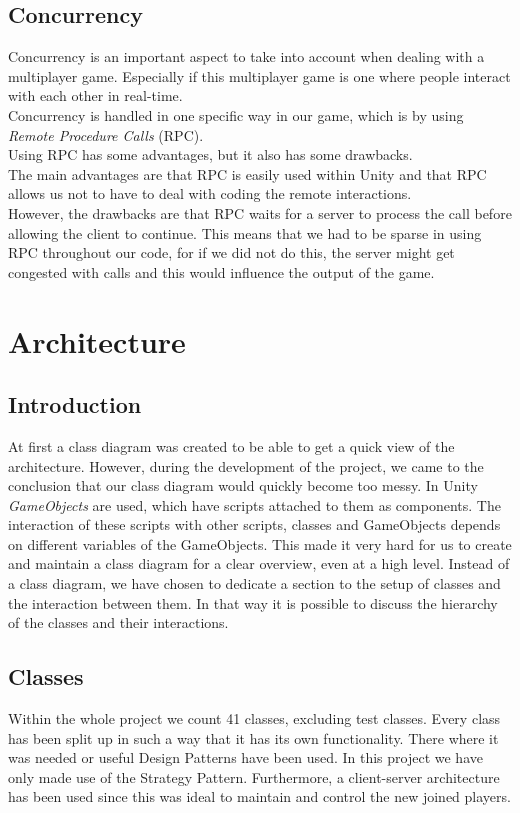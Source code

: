 \documentclass[11pt,twoside,a4paper]{article}
\begin{document}
\subsection{Concurrency}
Concurrency is an important aspect to take into account when dealing with a multiplayer game. Especially if this multiplayer game is one where people interact with each other in real-time.\\
Concurrency is handled in one specific way in our game, which is by using \emph{Remote Procedure Calls} (RPC).\\
Using RPC has some advantages, but it also has some drawbacks.\\
The main advantages are that RPC is easily used within Unity and that RPC allows us not to have to deal with coding the remote interactions.\\
However, the drawbacks are that RPC waits for a server to process the call before allowing the client to continue. This means that we had to be sparse in using RPC throughout our code, for if we did not do this, the server might get congested with calls and this would influence the output of the game.\\


\newpage

\section{Architecture}
\subsection{Introduction}
At first a class diagram was created to be able to get a quick view of the architecture. However, during the development of the project, we came to the conclusion that our class diagram would quickly become too messy. In Unity \emph{GameObjects} are used, which have scripts attached to them as components. The interaction of these scripts with other scripts, classes and GameObjects depends on different variables of the GameObjects. This made it very hard for us to create and maintain a class diagram for a clear overview, even at a high level.
Instead of a class diagram, we have chosen to dedicate a section to the setup of classes and the interaction between them. In that way it is possible to discuss the hierarchy of the classes and their interactions.

\subsection{Classes}
Within the whole project we count 41 classes, excluding test classes. Every class has been split up in such a way that it has its own functionality. There where it was needed or useful Design Patterns have been used. In this project we have only made use of the Strategy Pattern. Furthermore, a client-server architecture has been used since this was ideal to maintain and control the new joined players.
\end{document}

